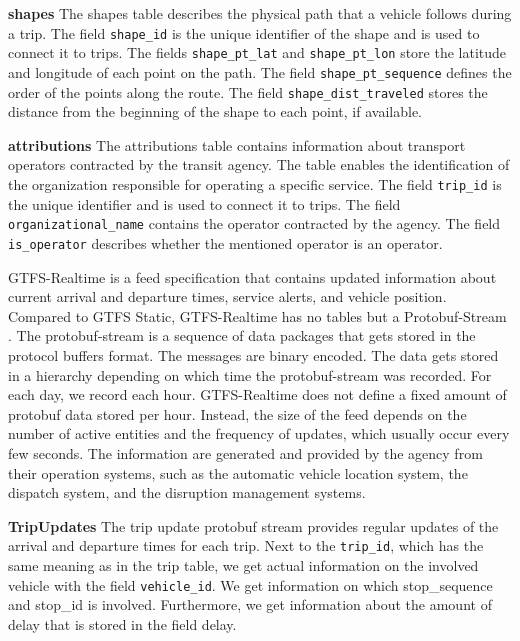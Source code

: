 \par\medskip
\noindent\textbf{shapes} \quad
The shapes table describes the physical path that a vehicle follows during a trip. The field \texttt{shape\_id} is the unique identifier of the shape and is used to connect it to trips. The fields \texttt{shape\_pt\_lat} and \texttt{shape\_pt\_lon} store the latitude and longitude of each point on the path. The field \texttt{shape\_pt\_sequence} defines the order of the points along the route. The field \texttt{shape\_dist\_traveled} stores the distance from the beginning of the shape to each point, if available.

\par\medskip
\noindent\textbf{attributions} \quad
The attributions table contains information about transport operators contracted by the transit agency. The table enables the identification of the organization responsible for operating a specific service. The field \texttt{trip\_id} is the unique identifier and is used to connect it to trips. The field \texttt{organizational\_name} contains the operator contracted by the agency. The field \texttt{is\_operator} describes whether the mentioned operator is an operator.

\vspace{0.2cm}
GTFS-Realtime \cite{GTFSRealtimeReference} is a feed specification that contains updated information about current arrival and departure times, service alerts, and vehicle position. Compared to GTFS Static, GTFS-Realtime has no tables but a Protobuf-Stream \cite{protobuf}. The protobuf-stream is a sequence of data packages that gets stored in the protocol buffers format. The messages are binary encoded. The data gets stored in a hierarchy depending on which time the protobuf-stream was recorded. For each day, we record each hour. GTFS-Realtime does not define a fixed amount of protobuf data stored per hour. Instead, the size of the feed depends on the number of active entities and the frequency of updates, which usually occur every few seconds.
The information are generated and provided by the agency from their operation systems, such as the automatic vehicle location system, the dispatch system, and the disruption management systems. 
\par\medskip
\noindent\textbf{TripUpdates} \quad
The trip update protobuf stream provides regular updates of the arrival and departure times for each trip. Next to the \texttt{trip\_id}, which has the same meaning as in the trip table, we get actual information on the involved vehicle with the field \texttt{vehicle\_id}. We get information on which stop\_sequence  and stop\_id is involved. Furthermore, we get information about the amount of delay that is stored in the field delay.


